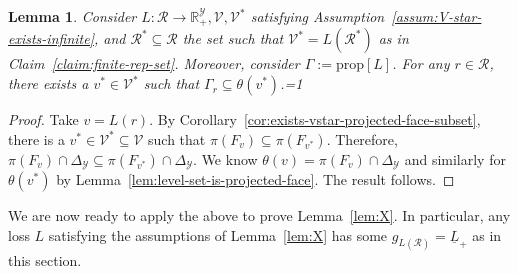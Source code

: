 \documentclass[11pt]{article}
\newcommand{\Comments}{1}
\newcommand{\mytodo}[2]{\ifnum\Comments=1%
  \todo[linecolor=#1!80!black,backgroundcolor=#1,bordercolor=#1!80!black]{#2}\fi}
\newcommand{\btw}[1]{\mytodo{gray!20!white}{BTW: #1}}%
\newcommand{\reals}{\mathbb{R}}
\newcommand{\prop}[1]{\mathrm{prop}[#1]}
\newcommand{\simplex}{\Delta_\Y}
\newcommand{\R}{\mathcal{R}}
\newcommand{\V}{\mathcal{V}}
\newcommand{\Y}{\mathcal{Y}}
\newcommand{\risk}[1]{\underline{#1}}
\newtheorem{lemma}{Lemma}
\begin{document}
\begin{lemma}\label{lem:any-levelset-contained-in-minlevelset}
  Consider $L : \R \to \reals^\Y_+, \V, \V^*$ satisfying Assumption~\ref{assum:V-star-exists-infinite}, and $\R^* \subseteq \R$ the set such that $\V^* = L(\R^*)$ as in Claim~\ref{claim:finite-rep-set}.
  Moreover, consider $\Gamma := \prop{L}$.
  For any $r \in \R$, there exists a $v^* \in \V^*$ such that $\Gamma_r \subseteq \theta(v^*)$.\btw{(7)}
\end{lemma}
\begin{proof}
  Take $v = L(r)$.
  By Corollary~\ref{cor:exists-vstar-projected-face-subset}, there is a $v^* \in \V^* \subseteq \V$ such that $\pi(F_v) \subseteq \pi(F_{v^*})$.
  Therefore, $\pi(F_v) \cap \simplex \subseteq \pi(F_{v^*})\cap \simplex$.  
  We know $\theta(v) = \pi(F_v) \cap \simplex$ and similarly for $\theta(v^*)$ by Lemma~\ref{lem:level-set-is-projected-face}.
  The result follows.
\end{proof}



We are now ready to apply the above to prove Lemma~\ref{lem:X}.
In particular, any loss $L$ satisfying the assumptions of Lemma~\ref{lem:X} has some $g_{L(\R)} = \risk{L}_+$ as in this section. 
\end{document}

